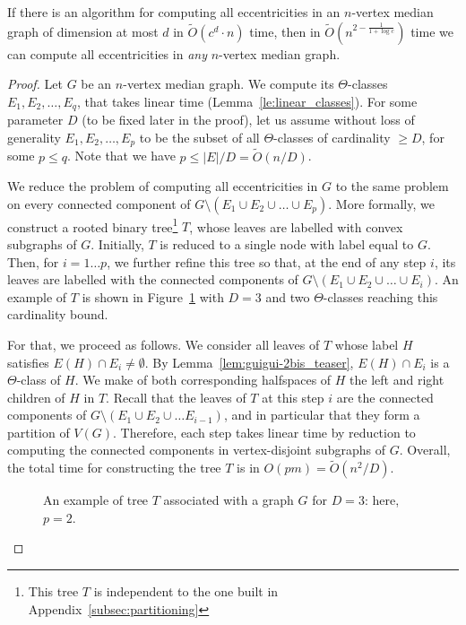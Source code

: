 \documentclass[a4paper,UKenglish,numberwithinsect,cleveref, autoref,anonymous]{lipics-v2021}
\newcommand{\card}[1]{\left| #1 \right|}
\begin{document}
\begin{lemma}\label{lem:guigui-4}
If there is an algorithm for computing all eccentricities in an $n$-vertex median graph of dimension at most $d$ in $\tilde{O}(c^d \cdot n)$ time, then in $\tilde{O}(n^{2 - \frac 1 {1+\log{c}}})$ time we can compute all eccentricities in {\em any} $n$-vertex median graph.
\end{lemma}
\begin{proof}
Let $G$ be an $n$-vertex median graph.
We compute its $\Theta$-classes $E_1,E_2,\ldots,E_q$, that takes linear time (Lemma~\ref{le:linear_classes}).
For some parameter $D$ (to be fixed later in the proof), let us assume without loss of generality $E_1,E_2,\ldots,E_p$ to be the subset of all $\Theta$-classes of cardinality $\geq D$, for some $p \leq q$. Note that we have $p \leq \card{E}/D = \tilde{O}(n/D)$.

We reduce the problem of computing all eccentricities in $G$ to the same problem on every connected component of $G \setminus (E_1 \cup E_2 \cup \ldots \cup E_p)$. 
More formally, we construct a rooted binary tree\footnote{This tree $T$ is independent to the one built in Appendix~\ref{subsec:partitioning}} $T$, whose leaves are labelled with convex subgraphs of $G$.
Initially, $T$ is reduced to a single node with label equal to $G$.
Then, for $i = 1 \ldots p$, we further refine this tree so that, at the end of any step $i$, its leaves are labelled with the connected components of $G \setminus \left(E_1 \cup E_2 \cup \ldots \cup E_i\right)$. An example of $T$ is shown in Figure~\ref{fig:reduction} with $D=3$ and two $\Theta$-classes reaching this cardinality bound.

For that, we proceed as follows.
We consider all leaves of $T$ whose label $H$ satisfies $E(H) \cap E_i \neq \emptyset$.
By Lemma~\ref{lem:guigui-2bis_teaser}, $E(H) \cap E_i$ is a $\Theta$-class of $H$.
We make of both corresponding halfspaces of $H$ the left and right children of $H$ in $T$. 
Recall that the leaves of $T$ at this step $i$ are the connected components of $G \setminus (E_1 \cup E_2 \cup \ldots E_{i-1})$, and in particular that they form a partition of $V(G)$.
Therefore, each step takes linear time by reduction to computing the connected components in vertex-disjoint subgraphs of $G$.
Overall, the total time for constructing the tree $T$ is in ${O}(pm) = \tilde{O}(n^2/D)$.

\begin{figure}[h]
\centering
\scalebox{0.6}{}
\caption{An example of tree $T$ associated with a graph $G$ for $D=3$: here, $p=2$.}
\label{fig:reduction}
\end{figure}


\end{proof}
\end{document}
